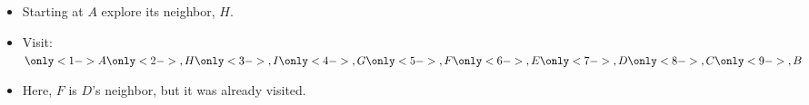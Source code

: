 \documentclass{beamer}
\begin{document}
\begin{frame}
\begin{columns}[c]
\begin{center}
\begin{tikzpicture}[auto,node distance=2cm,
 thick,main node/.style={circle,draw}, minimum size=.7cm]
   
\end{tikzpicture}

\end{center}
\begin{itemize}
\item<1> Starting at $A$ explore its  neighbor, $H$.
\item Visit: \\
 $ \only<1->{A}\only<2->{, H}\only<3->{, I}\only<4->{, G}\only<5->{, F}\only<6->{, E}\only<7->{, D}\only<8->{, C}\only<9->{, B}$
\item<8> Here, $F$ is $D$'s neighbor, but it was already visited.
\end{itemize}
\end{columns}
\end{frame}
\end{document}

